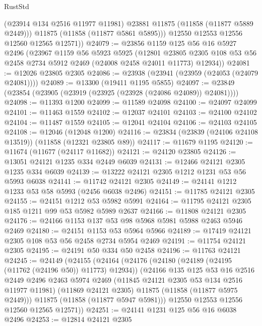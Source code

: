 \begin{lexlean}{RustStd}
\begin{coremodule}
            (@23914 @134 @2516 @11977 @11981)
            @23881
            @11875
            (@11858 (@11877 @5889 @2449)))
          @11875
          (@11858 (@11877 @5861 @5895)))
        @12550
        @12553
        @12556
        @12560
        @12565
        @12571))
@24079 := @23856
    @1159
    @125
    @56
    @16
    @5927
    @2496
    (@23967
      @1159
      @56
      @5923
      @5925
      (@12801
        @23805
        @2305
        @108
        @53
        @56
        @2458
        @2734
        @5912
        @2469
        (@24008 @2458 @24011 @11773)
        @12934))
@24081 := @12026 @23805 @2305
@24086 := @23938 (@23941 (@23959 (@24053 (@24079 @24081))))
@24089 := @13300 (@19411 @1195 @5855)
@24097 := @23849 (@23854 (@23905 (@23919 (@23925 (@23928 (@24086 @24089)) @24081))))
@24098 := @11393 @1200
@24099 := @11589 @24098
@24100 := @24097 @24099
@24101 := @11463 @1559
@24102 := @12037 @24101
@24103 := @24100 @24102
@24104 := @11487 @1559
@24105 := @12041 @24104
@24106 := @24103 @24105
@24108 := @12046 (@12048 @1200)
@24116 := @23834 (@23839 (@24106 @24108 @13519)) (@11858 (@12321 @23805 @89))
@24117 := @11679 @1195
@24120 := @11674 (@11677 (@24117 @11682))
@24121 := @24120 @23805
@24126 := @13051 @24121 @1235 @334 @2449 @6039
@24131 := @12466 @24121 @2305 @1235 @334 @6039
@24139 := @13222 @24121 @2305 @1212 @1231 @53 @56 @5993 @6038
@24141 := @11742 @24121 @2305
@24149 := @24141 @1212 @1233 @53 @58 @5993 (@2456 @6038 @2496)
@24151 := @11785 @24121 @2305
@24155 := @24151 @1212 @53 @5982 @5991
@24164 := @11795 @24121 @2305 @185 @1211 @99 @53 @5982 @5989 @2637
@24166 := @11808 @24121 @2305
@24176 := @24166 @1153 @137 @53 @98 @5968 @5981 @5988 @2463 @5946 @2469
@24180 := @24151 @1153 @53 @5964 @5966
@24189 := @17419 @24121 @2305 @108 @53 @56 @2458 @2734 @5954 @2469
@24191 := @11754 @24121 @2305
@24195 := @24191 @50 @334 @50 @2458
@24196 := @11763 @24121
@24245 := @24149
    (@24155
      (@24164
        (@24176
          (@24180 (@24189 (@24195 (@11762 (@24196 @50)) @11773) @12934))
          (@24166
            @135
            @125
            @53
            @16
            @2516
            @2449
            @2496
            @2463
            @5974
            @2469
            (@11845 @24121 @2305 @53 @134 @2516 @11977 @11981)
            (@11869 @24121 @2305)
            @11875
            (@11858 (@11877 @5975 @2449)))
          @11875
          (@11858 (@11877 @5947 @5981)))
        @12550
        @12553
        @12556
        @12560
        @12565
        @12571))
@24251 := @24141 @1231 @125 @56 @16 @6038 @2496
@24253 := @12814 @24121 @2305

\end{coremodule}
\end{lexlean}
